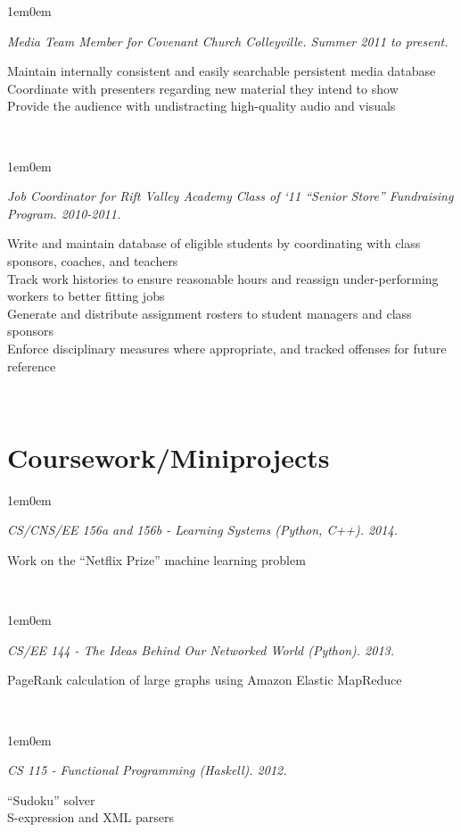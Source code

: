 \documentclass[10pt,letterpaper, full]{article}
\newcommand{\pjtitle}[1]{\renewcommand{\givenpjtitle}{#1}}
\newcommand{\pjtime}[1]{\renewcommand{\givenpjtime}{#1}}
\newcommand{\pjbody}[1]{\renewcommand{\givenpjbody}{#1}}
\newcommand{\givenpjtitle}{REQUIRED!}
\newcommand{\givenpjtime}{REQUIRED!}
\newcommand{\givenpjbody}{REQUIRED!}
\newenvironment{projectenv}
    {
        \begin{adjustwidth}{1em}{0em}
    }
    {
        \textit{\givenpjtitle. \givenpjtime.}

        \begin{minipage}[l]{\textwidth}
            \givenpjbody%
        \end{minipage}\\%


        \end{adjustwidth}
    }
\begin{document}
\begin{projectenv}%
    \pjtitle{Media Team Member for Covenant Church Colleyville}
    \pjtime{Summer 2011 to present}
    \pjbody{
        Maintain internally consistent and easily searchable persistent media database\\
        Coordinate with presenters regarding new material they intend to show\\
        Provide the audience with undistracting high-quality audio and visuals
    }
\end{projectenv}%

\begin{projectenv}%
    \pjtitle{Job Coordinator for Rift Valley Academy Class of ‘11 “Senior Store” Fundraising Program}
    \pjtime{2010-2011}
    \pjbody{
        Write and maintain database of eligible students by coordinating with class sponsors, coaches, and teachers\\
        Track work histories to ensure reasonable hours and reassign under-performing workers to better fitting jobs\\
        Generate and distribute assignment rosters to student managers and class sponsors\\
        Enforce disciplinary measures where appropriate, and tracked offenses for future reference
    }
\end{projectenv}%



\section{Coursework/Miniprojects}

\begin{projectenv}%
    \pjtitle{CS/CNS/EE 156a and 156b - Learning Systems (Python, C++)}
    \pjtime{2014}
    \pjbody{
        Work on the “Netflix Prize” machine learning problem
    }
\end{projectenv}%

\begin{projectenv}%
    \pjtitle{CS/EE 144 - The Ideas Behind Our Networked World (Python)}
    \pjtime{2013}
    \pjbody{
        PageRank calculation of large graphs using Amazon Elastic MapReduce
    }
\end{projectenv}%

\begin{projectenv}%
    \pjtitle{CS 115 - Functional Programming (Haskell)}
    \pjtime{2012}
    \pjbody{
        “Sudoku” solver\\
        S-expression and XML parsers\\
    }
\end{projectenv}%
\end{document}
